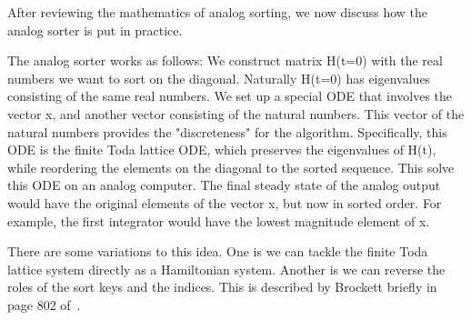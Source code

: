 After reviewing the mathematics of analog sorting, we now discuss how the analog sorter is put in practice.

The analog sorter works as follows:
We construct matrix H(t=0) with the real numbers we want to sort on the diagonal.
Naturally H(t=0) has eigenvalues consisting of the same real numbers.
We set up a special ODE that involves the vector x, and another vector consisting of the natural numbers.
This vector of the natural numbers provides the "discreteness" for the algorithm.
Specifically, this ODE is the finite Toda lattice ODE, which preserves the eigenvalues of H(t), while reordering the elements on the diagonal to the sorted sequence.
This solve this ODE on an analog computer.
The final steady state of the analog output would have the original elements of the vector x, but now in sorted order.
For example, the first integrator would have the lowest magnitude element of x.



There are some variations to this idea.
One is we can tackle the finite Toda lattice system directly as a Hamiltonian system.
Another is we can reverse the roles of the sort keys and the indices.
This is described by Brockett briefly in page 802 of~\cite{brockett}.
